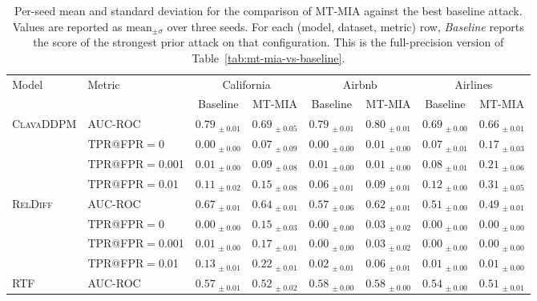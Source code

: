 \begin{table}[t]
  \centering
  \small
  \setlength{\tabcolsep}{4pt}
  \caption{Per-seed mean and standard deviation for the comparison of MT-MIA against the best baseline attack. Values are reported as $\text{mean}_{\pm\sigma}$ over three seeds. For each (model, dataset, metric) row, \emph{Baseline} reports the score of the strongest prior attack on that configuration. This is the full-precision version of Table~\ref{tab:mt-mia-vs-baseline}.}
  \label{tab:mt-mia-vs-baseline-full}
  \begin{tabular}{llcccccc}
    \toprule
    Model & Metric & \multicolumn{2}{c}{California} & \multicolumn{2}{c}{Airbnb} & \multicolumn{2}{c}{Airlines} \\
    \cmidrule(lr){3-4} \cmidrule(lr){5-6} \cmidrule(lr){7-8}
     &  & Baseline & MT-MIA & Baseline & MT-MIA & Baseline & MT-MIA \\
    \midrule
    \textsc{ClavaDDPM} & AUC-ROC & $0.79_{\,\pm0.01}$ & $0.69_{\,\pm0.05}$ & $0.79_{\,\pm0.01}$ & $0.80_{\,\pm0.01}$ & $0.69_{\,\pm0.00}$ & $0.66_{\,\pm0.01}$ \\
     & TPR@FPR$=$0 & $0.00_{\,\pm0.00}$ & $0.07_{\,\pm0.09}$ & $0.00_{\,\pm0.00}$ & $0.01_{\,\pm0.00}$ & $0.07_{\,\pm0.01}$ & $0.17_{\,\pm0.03}$ \\
     & TPR@FPR$=$0.001 & $0.01_{\,\pm0.00}$ & $0.09_{\,\pm0.08}$ & $0.01_{\,\pm0.00}$ & $0.01_{\,\pm0.00}$ & $0.08_{\,\pm0.01}$ & $0.21_{\,\pm0.06}$ \\
     & TPR@FPR$=$0.01 & $0.11_{\,\pm0.02}$ & $0.15_{\,\pm0.08}$ & $0.06_{\,\pm0.01}$ & $0.09_{\,\pm0.01}$ & $0.12_{\,\pm0.00}$ & $0.31_{\,\pm0.05}$ \\
    \midrule
    \textsc{RelDiff} & AUC-ROC & $0.67_{\,\pm0.01}$ & $0.64_{\,\pm0.01}$ & $0.57_{\,\pm0.06}$ & $0.62_{\,\pm0.01}$ & $0.51_{\,\pm0.00}$ & $0.49_{\,\pm0.01}$ \\
     & TPR@FPR$=$0 & $0.00_{\,\pm0.00}$ & $0.15_{\,\pm0.03}$ & $0.00_{\,\pm0.00}$ & $0.03_{\,\pm0.02}$ & $0.00_{\,\pm0.00}$ & $0.00_{\,\pm0.00}$ \\
     & TPR@FPR$=$0.001 & $0.01_{\,\pm0.00}$ & $0.17_{\,\pm0.01}$ & $0.00_{\,\pm0.00}$ & $0.03_{\,\pm0.02}$ & $0.00_{\,\pm0.00}$ & $0.00_{\,\pm0.00}$ \\
     & TPR@FPR$=$0.01 & $0.13_{\,\pm0.01}$ & $0.22_{\,\pm0.01}$ & $0.02_{\,\pm0.01}$ & $0.06_{\,\pm0.01}$ & $0.01_{\,\pm0.00}$ & $0.01_{\,\pm0.00}$ \\
    \midrule
    \textsc{RTF} & AUC-ROC & $0.57_{\,\pm0.01}$ & $0.52_{\,\pm0.02}$ & $0.58_{\,\pm0.00}$ & $0.58_{\,\pm0.00}$ & $0.54_{\,\pm0.00}$ & $0.51_{\,\pm0.01}$ \\

\end{tabular}
\end{table}
